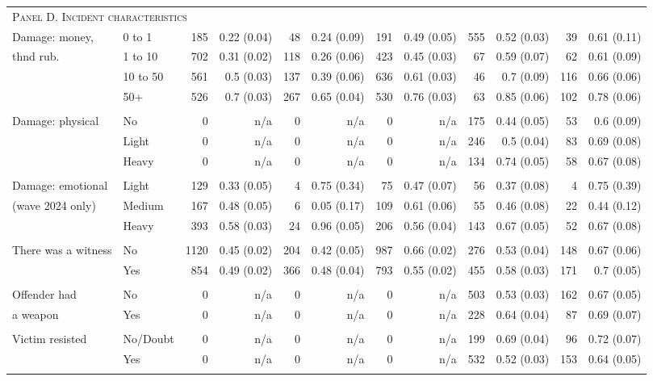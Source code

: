 \begin{tabular}{p{1.3in}p{1.1in}rrrrrrrrrr}
	 \midrule
		\multicolumn{12}{l}{\textsc{Panel D. Incident characteristics}} \\
Damage: money,& 0 to 1 & 185 & 0.22 (0.04) & 48 & 0.24 (0.09) & 191 & 0.49 (0.05) & 555 & 0.52 (0.03) & 39 & 0.61 (0.11) \\ 
 thnd rub. & 1 to 10 & 702 & 0.31 (0.02) & 118 & 0.26 (0.06) & 423 & 0.45 (0.03) & 67 & 0.59 (0.07) & 62 & 0.61 (0.09) \\ 
& 10 to 50 & 561 & 0.5 (0.03) & 137 & 0.39 (0.06) & 636 & 0.61 (0.03) & 46 & 0.7 (0.09) & 116 & 0.66 (0.06) \\ 
& 50+ & 526 & 0.7 (0.03) & 267 & 0.65 (0.04) & 530 & 0.76 (0.03) & 63 & 0.85 (0.06) & 102 & 0.78 (0.06) \\ 
	 	\vspace{1pt}\\
Damage: physical & No & 0 & n/a & 0 & n/a & 0 & n/a & 175 & 0.44 (0.05) & 53 & 0.6 (0.09) \\ 
& Light & 0 & n/a & 0 & n/a & 0 & n/a & 246 & 0.5 (0.04) & 83 & 0.69 (0.08) \\ 
& Heavy & 0 & n/a & 0 & n/a & 0 & n/a & 134 & 0.74 (0.05) & 58 & 0.67 (0.08) \\ 
	 	\vspace{1pt}\\
Damage: emotional & Light & 129 & 0.33 (0.05) & 4 & 0.75 (0.34) & 75 & 0.47 (0.07) & 56 & 0.37 (0.08) & 4 & 0.75 (0.39) \\ 
(wave 2024 only) & Medium & 167 & 0.48 (0.05) & 6 & 0.05 (0.17) & 109 & 0.61 (0.06) & 55 & 0.46 (0.08) & 22 & 0.44 (0.12) \\ 
& Heavy & 393 & 0.58 (0.03) & 24 & 0.96 (0.05) & 206 & 0.56 (0.04) & 143 & 0.67 (0.05) & 52 & 0.67 (0.08) \\ 
	 	\vspace{1pt}\\
There was a witness & No & 1120 & 0.45 (0.02) & 204 & 0.42 (0.05) & 987 & 0.66 (0.02) & 276 & 0.53 (0.04) & 148 & 0.67 (0.06) \\ 
& Yes & 854 & 0.49 (0.02) & 366 & 0.48 (0.04) & 793 & 0.55 (0.02) & 455 & 0.58 (0.03) & 171 & 0.7 (0.05) \\ 
	 	\vspace{1pt}\\
Offender had & No & 0 & n/a & 0 & n/a & 0 & n/a & 503 & 0.53 (0.03) & 162 & 0.67 (0.05) \\ 
a weapon & Yes & 0 & n/a & 0 & n/a & 0 & n/a & 228 & 0.64 (0.04) & 87 & 0.69 (0.07) \\ 
	 	\vspace{1pt}\\
Victim resisted & No/Doubt & 0 & n/a & 0 & n/a & 0 & n/a & 199 & 0.69 (0.04) & 96 & 0.72 (0.07) \\ 
& Yes & 0 & n/a & 0 & n/a & 0 & n/a & 532 & 0.52 (0.03) & 153 & 0.64 (0.05) \\ 
	 	\vspace{1pt}\\


\end{tabular}
